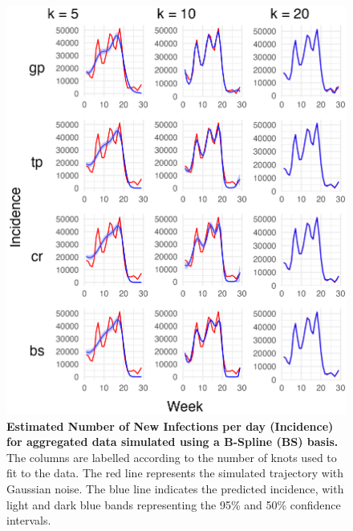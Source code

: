 \documentclass[
11pt, %
oneside, %
english, %
singlespacing, %
]{macthesis} %
\begin{document}
\begin{figure}[H]
\centering
\includegraphics[width=\textwidth]{figure/Simulated/aggregated/simulation_agg_bs_20_k(5,10,20)_bsd1_beta1_plot_incidence.png}
\caption[Predicted Simulated and Aggregated Data (BS) Incidence]{\textbf{Estimated Number of New Infections per day (Incidence) for aggregated data simulated using a B-Spline (BS) basis.} The columns are labelled according to the number of knots used to fit to the data. The red line represents the simulated trajectory with Gaussian noise. The blue line indicates the predicted incidence, with light and dark blue bands representing the 95\% and 50\% confidence intervals.}
\label{fig:incidence_agg_bs}
\end{figure}
\end{document}
